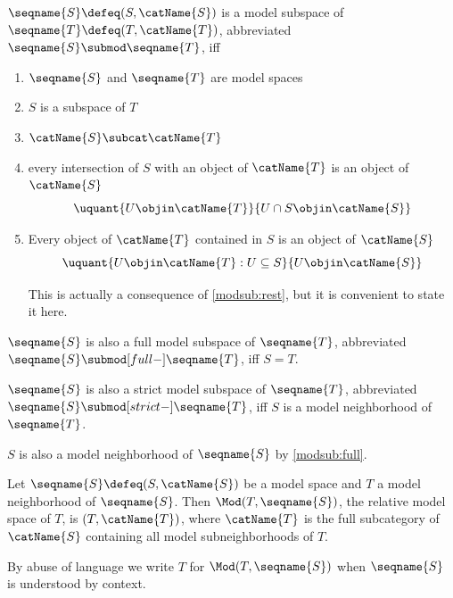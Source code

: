 \documentclass{article}
\begin{document}
\begin{definition}
\label{def:modsub}
$\seqname{S} \defeq (S, \catName{S})$ is a model subspace of
$\seqname{T} \defeq (T, \catName{T})$, abbreviated
$\seqname{S} \submod \seqname{T}$, iff

\begin{enumerate}
\item $\seqname{S}$ and $\seqname{T}$ are model spaces
\item $S$ is a subspace of $T$
\label{modsub:sub}

\item $\catName{S} \subcat \catName{T}$
\label{modsub:subcat}

\item every intersection of $S$ with an object of $\catName{T}$ is an object of$\catName{S}$
\label{modsub:rest}
\begin{equation}
\uquant%
  {U \objin \catName{T}}
  {U \cap S \objin \catName{S}}
\end{equation}

\item
\label{modsub:full}
Every object of $\catName{T}$ contained in $S$ is an object of
$\catName{S}$
\begin{equation}
\uquant%
  {U \objin \catName{T}: U \subseteq S}
  {U \objin \catName{S}}
\end{equation}

\begin{remark}
This is actually a consequence of \cref{modsub:rest}, but it is
convenient to state it here.
\end{remark}
\end{enumerate}

$\seqname{S}$ is also a full model subspace of $\seqname{T}$,
abbreviated $\seqname{S} \submod[full-] \seqname{T}$, iff
$S = T$.

$\seqname{S}$ is also a strict model subspace of $\seqname{T}$,
abbreviated $\seqname{S} \submod[strict-] \seqname{T}$, iff
$S$ is a model neighborhood of $\seqname{T}$.
\begin{remark}
$S$ is also a model neighborhood of $\seqname{S}$ by \cref{modsub:full}.
\end{remark}

Let $\seqname{S} \defeq (S, \catName{S})$ be a model space and $T$ a
model neighborhood of $\seqname{S}$. Then $\Mod(T,\seqname{S})$, the
relative model space of $T$, is $(T, \catName{T})$, where $\catName{T}$
is the full subcategory of $\catName{S}$ containing all model
subneighborhoods of $T$.

By abuse of language we write $T$ for $\Mod(T,\seqname{S})$ when
$\seqname{S}$ is understood by context.
\end{definition}
\end{document}
